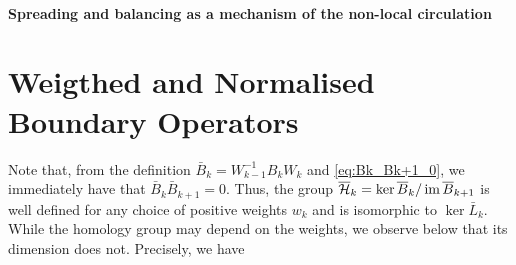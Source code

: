 \paragraph{ Spreading and balancing as a mechanism of the non-local circulation}
















\section{ Weigthed and Normalised Boundary Operators}







Note that, from the definition \( \bar B_k= W_{k-1}^{-1} B_k W_k \) and \eqref{eq:Bk_Bk+1_0}, we immediately have that  \( \bar B_k\bar B_{k+1}=0 \). Thus, the group \( \overline{\mathcal{H}}_k = \ker \overline{B}_k / \operatorname{im} \overline{B}_{k+1} \) is well defined for any choice of positive weights  \( w_k \) and is isomorphic to \( \ker \bar L_k \). While the homology group may depend on the weights,  we observe below that its dimension does not. Precisely, we have 

